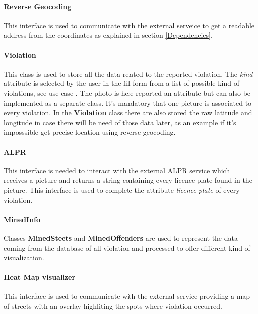 \paragraph{Reverse Geocoding}
This interface is used to communicate with the external serveice to get a readable address from the coordinates as explained in section \ref{Dependencies}.

\paragraph{Violation}
This class is used to store all the data related to the reported violation. The \textit{kind} attribute is selected by the user in the fill form from a list of possible kind of violations, see use case \ucas{}. The photo is here reported an attribute but can also be implemented as a separate class. It's mandatory that one picture is associated to every violation. In the \textbf{Violation} class there are also stored the raw latitude and longitude in case there will be need of those data later, as an example if it's imposssible get precise location using reverse geocoding.

\paragraph{ALPR}
This interface is needed to interact with the external ALPR service which receives a picture and returns a string containing every licence plate found in the picture. This interface is used to complete the attribute \textit{licence plate} of every violation.

\paragraph{MinedInfo}
Classes \textbf{MinedSteets} and \textbf{MinedOffenders} are used to represent the data coming from the database of all violation and processed to offer different kind of visualization.

\paragraph{Heat Map visualizer}
This interface is used to communicate with the external service providing a map of streets with an overlay highliting the spots where violation occurred.

